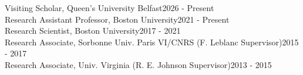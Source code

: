 \documentclass[12pt]{report}
\begin{document}
\noindent Visiting Scholar, Queen's University Belfast\hfill 2026 - Present\\
\noindent Research Assistant Professor, Boston University\hfill 2021 - Present\\
\noindent Research Scientist, Boston University\hfill 2017 - 2021\\
\noindent Research Associate, Sorbonne Univ. Paris VI/CNRS (F. Leblanc Supervisor)\hfill 2015 - 2017\\
\noindent Research Associate, Univ. Virginia (R. E. Johnson Supervisor)\hfill 2013 - 2015\\
\end{document}
